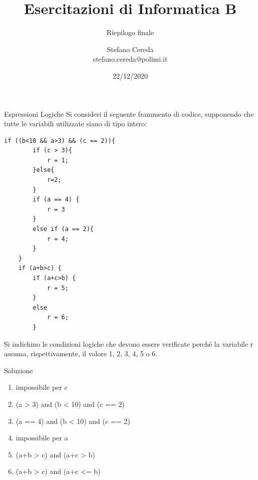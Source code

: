 \documentclass[aspectratio=169,]{beamer}
\title{Esercitazioni di Informatica B}
\subtitle{Riepilogo finale}
\author{Stefano Cereda\\
stefano.cereda@polimi.it
}
\date{22/12/2020}
\institute[PoliMi]{Politecnico Milano}
\begin{document}
\begin{frame}
    \maketitle
\end{frame}

\begin{frame}{Espressioni Logiche}
    Si consideri il seguente frammento di codice, supponendo che tutte le variabili utilizzate siano di tipo intero:
    \begin{lstlisting}[style=CStyle, basicstyle=\tiny]
    if ((b<10 && a>3) && (c == 2)){
        if (c > 3){
            r = 1;
        }else{
            r=2;
        }
        if (a == 4) {
            r = 3
        }
        else if (a == 2){
            r = 4;
        }
    }
    if (a+b>c) {
        if (a+c>b) {
            r = 5;
        }
        else
            r = 6;
        }
    \end{lstlisting}

    Si indichino le condizioni logiche che devono essere verificate perché la variabile r assuma, rispettivamente, il
    valore 1, 2, 3, 4, 5 o 6.
\end{frame}

\begin{frame}{Soluzione}
    \begin{enumerate}
        \item impossibile per c
        \item (a > 3) and (b < 10) and (c == 2)
        \item (a == 4) and (b < 10) and (c == 2)
        \item impossibile per a
        \item (a+b > c) and (a+c > b)
        \item (a+b > c) and (a+c <= b)
    \end{enumerate}
\end{frame}
\end{document}
